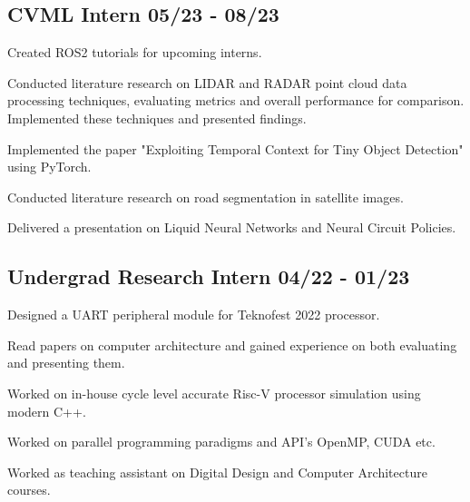 \documentclass[a4paper,12pt]{article}
\begin{document}


\vspace*{10pt}
\subsection{{CVML Intern }\hfill 05/23 - 08/23}
\begin{zitemize}
    \item Created ROS2 tutorials for upcoming interns.
    \item Conducted literature research on LIDAR and RADAR point cloud data processing techniques, evaluating metrics and overall performance for comparison. Implemented these techniques and presented findings.
    \item Implemented the paper "Exploiting Temporal Context for Tiny Object Detection" using PyTorch.
    \item Conducted literature research on road segmentation in satellite images.
    \item Delivered a presentation on Liquid Neural Networks and Neural Circuit Policies.
\end{zitemize}


\vspace*{6pt}
\subsection{{Undergrad Research Intern }\hfill 04/22 - 01/23}
\begin{zitemize}
\item Designed a UART peripheral module for Teknofest 2022 processor. 
\item Read papers on computer architecture and gained experience on both evaluating and presenting them.
\item Worked on in-house cycle level accurate Risc-V processor simulation using modern C++.
\item Worked on parallel programming paradigms and API's OpenMP, CUDA etc.
\item Worked as teaching assistant on Digital Design and Computer Architecture courses.

\end{zitemize}
\end{document}
